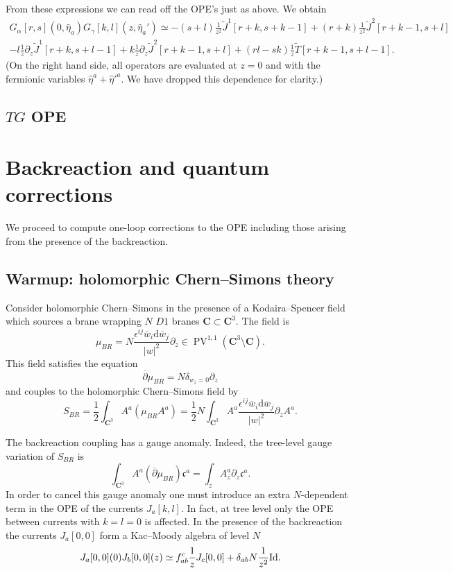 \documentclass[11pt]{amsart}
\newcommand{\dbar}{\br{\partial}}
\newcommand{\wbar}{\br{w}}
\newcommand{\zbar}{\br{z}}
\newcommand{\PV}{\op{PV}}
\newcommand{\eps}{\epsilon}
\newcommand{\what}{\widehat}
\newcommand{\til}{\widetilde}
\newcommand{\br}{\overline}
\newcommand{\CC}{\mathbf C}
\newcommand{\op}{\operatorname}
\newcommand{\mf}{\mathfrak}
\newcommand{\abs}[1]{\left| #1 \right|}
\renewcommand{\d}{\mathrm{d}}
\theoremstyle{thm}
\numberwithin{equation}{subsection}
\theoremstyle{def}
\theoremstyle{rem}
\newcommand{\fc}{\mf{c}}
\begin{document}
From these expressions we can read off the OPE's just as above. 
We obtain
\begin{multline}
G_{\alpha} [r,s] (0,\what\eta_a) G_{\gamma}[k,l](z,\what\eta_a') \simeq  - (s+l) \frac{1}{z^2} \til{J}^1[r+k, s+k-1] + (r + k) \frac1{z^2} \til{J}^2 [r+k-1, s+l] \\
- l \frac1z \partial_z \til{J}^1[r+k, s+l-1] + k \frac1z\partial_z \til{J}^2 [r+k-1, s+l]
+(rl-sk) \frac1z \til{T}[r+k-1, s+l-1] .
\end{multline}
(On the right hand side, all operators are evaluated at $z = 0$ and with the fermionic variables $\what{\eta}^a+\what{\eta}'^{a}$.  We have dropped this dependence for clarity.)

\subsection{$TG$ OPE}

\section{Backreaction and quantum corrections}
\label{sec:br}

We proceed to compute one-loop corrections to the OPE including those arising from the presence of the backreaction. 

\subsection{Warmup: holomorphic Chern--Simons theory}

Consider holomorphic Chern--Simons in the presence of a Kodaira--Spencer field which sources a brane wrapping $N$ $D1$ branes $\CC \subset \CC^3$. 
The field is 
\[
\mu_{BR} = N \frac{\eps^{ij} \wbar_i \d \wbar_j}{\abs{w}^2} \partial_z \in \PV^{1,1} (\CC^3 \setminus \CC) . 
\]
This field satisfies the equation
\[
\dbar \mu_{BR} = N \delta_{w_i = 0} \partial_z 
\]
and couples to the holomorphic Chern--Simons field by 
\[
S_{BR} = \frac12 \int_{\CC^3} A^a (\mu_{BR} A^a) = \frac12 N \int_{\CC^3} A^a \frac{\eps^{ij} \wbar_i \d \wbar_j}{\abs{w}^2} \partial_z A^a .
\]

The backreaction coupling has a gauge anomaly. 
Indeed, the tree-level gauge variation of $S_{BR}$ is
\[
\int_{\CC^3} A^a (\dbar \mu_{BR}) \fc^a = \int_{z} A_{\zbar}^a \partial_z \fc^a .
\]
In order to cancel this gauge anomaly one must introduce an extra $N$-dependent term in the OPE of the currents $J_a[k,l]$. 
In fact, at tree level only the OPE between currents with $k=l=0$ 
is affected.
In the presence of the backreaction the currents $J_a[0,0]$ form a Kac--Moody algebra of level $N$
\[
J_a[0,0] (0) J_b [0,0] (z) \simeq f_{ab}^c \frac1z J_c[0,0] + \delta_{ab} N \frac1{z^2} {\rm Id} .
\]
\end{document}
